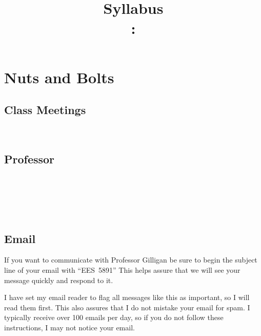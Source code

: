 \documentclass[11pt,twoside]{jgsyllabus}\usepackage[]{graphicx}\usepackage[]{xcolor}
\title{Syllabus\\
\ShortCourseNumber: \LongCourseName}
\begin{document}
\maketitle
\tableofcontents

\clearpage
\section[Nuts \& Bolts]{Nuts and Bolts}
\label{sec:NutsAndBolts}
\subsection{Class Meetings}
\ClassMeetings\\
\subsection{Professor}
\label{sec:Professor}
\ProfName\\
\ProfDescr\\
\ProfEmail\\
\ProfWeb\\
\ProfOfficeHours
%
\iffalse
\subsection{Teaching Assistant}
\label{sec:TA}
\TaName\\
\TaEmail\\
\TaOfficeHours
\medskip

\noindent
\TaTitle\ will be grading labs and homework, so address questions about your
homework and lab grades to \TaAccusative.
\fi

\subsection{Email}
If you want to communicate with Professor Gilligan
be sure to
begin the subject line of your email with ``{\scshape EES~5891}''
This helps assure
that we will see your message quickly and respond to it.

I have set my email reader to flag all messages like this as important, so I
will read them first.
This also assures that I do not mistake your email for spam. I typically
receive over 100 emails per day, so if you do not follow these instructions,
I may not notice your email.
\end{document}
